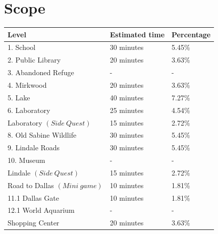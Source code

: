  \section{Scope}

\vspace*{0.5cm}

\begin{center}
	\begin{tabular}[c]{| p{6cm} | p{4cm} | p{3cm} |}
		\hline
		               \textbf{Level}                 & \textbf{Estimated time}     & \textbf{Percentage} \\ \hline
		                  1. School                   & 30 minutes                  & 5.45\%                 \\ \hline
		              2. Public Library               & 20 minutes                  & 3.63\%                 \\ \hline
		             3. Abandoned Refuge              & -			                & -	                  \\ \hline
		                 4. Mirkwood                  & 20 minutes                  & 3.63\%                 \\ \hline
		                   5. Lake                    & 40 minutes                  & 7.27\%                 \\ \hline
		                6. Laboratory                 & 25 minutes                  & 4.54\%                 \\
					 Laboratory $(Side\:Quest)$	  & 15 minutes					& 2.72\%				\\ \hline
		           8. Old Sabine Wildlife             & 30 minutes                  & 5.45\%                 \\ \hline
		              9. Lindale Roads                & 30 minutes                  & 5.45\%                 \\ \hline
		                 10. Museum                   & -              			    & -      	          \\
					Lindale $(Side\:Quest)$			  & 15 minutes					& 2.72\%				  \\ \hline
				Road to Dallas $(Mini\:game)$		  & 10 minutes					& 1.81\%				  \\ \hline
		               11.1 Dallas Gate               & 10 minutes                  & 1.81\%                 \\ \hline
					 12.1 World Aquarium              & -        		     	    & -              	   \\
						 Shopping Center              & 20 minutes                  & 3.63\%                 \\

\end{tabular}
\end{center}

